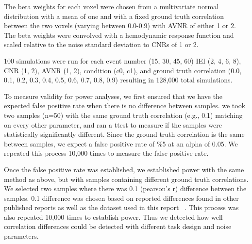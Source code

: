 \documentclass[10pt,letterpaper]{article}
\begin{document}
The beta weights for each voxel were chosen from a multivariate normal distribution
with a mean of one and with a fixed ground truth correlation between the two voxels 
(varying between 0.0-0.9) with AVNR of either 1 or 2.
The beta weights were convolved with a hemodynamic response function and scaled
relative to the noise standard deviation to CNRs of 1 or 2.

100 simulations were run for each event number (15, 30, 45, 60) IEI (2, 4, 6, 8), 
CNR (1, 2), AVNR (1, 2), condition (c0, c1), and ground truth correlation
(0.0, 0.1, 0.2, 0.3, 0.4, 0.5, 0.6, 0.7, 0.8, 0.9)
resulting in 128,000 total simulations.

To measure validity for power analyses, we first ensured that we have
the expected false positive rate when there is no difference between samples.
we took two samples (n=50) with the same ground truth correlation (e.g., 0.1)
matching on every other parameter, and ran a ttest to measure if the samples
were statistically significantly different.
Since the ground truth correlation is the same between samples,
we expect a false positive rate of \%5 at an alpha of 0.05.
We repeated this process 10,000 times to measure the false positive rate.

Once the false positive rate was established, we established power with the same method as above,
but with samples containing different ground truth correlations.
We selected two samples where there was 0.1 (pearson's r) difference between the samples.
0.1 difference was chosen based on reported differences found in other published
reports as well as the dataset used in this report ~\cite{Katsura2014,Lee2017,Turner2017,Lin2019,Huang2019}.
This process was also repeated 10,000 times to establish power.
Thus we detected how well correlation differences could be detected
with different task design and noise parameters.
\end{document}
